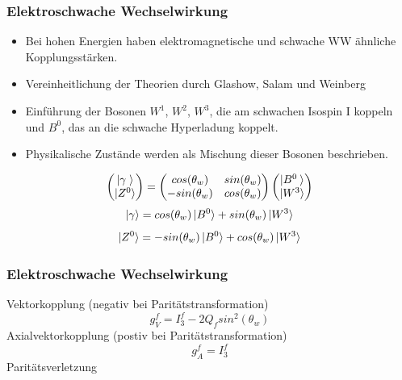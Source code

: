 \begin{frame}
	\frametitle{Elektroschwache Wechselwirkung}
	\begin{center}
		\begin{itemize}
			\item
			Bei hohen Energien haben elektromagnetische und schwache WW ähnliche Kopplungsstärken.
			\item
			Vereinheitlichung der Theorien durch Glashow, Salam und Weinberg
			\item
			Einführung der Bosonen $W^1$, $W^2$, $W^3$, die am schwachen Isospin I koppeln und $B^0$, das an die schwache Hyperladung koppelt.
			\item
			Physikalische Zustände werden als Mischung dieser Bosonen beschrieben.
		\end{itemize}
		\begin{equation*}
		\begin{pmatrix}
		\ket{\gamma\;}\\
		\ket{Z^0}
		\end{pmatrix} = 
		\begin{pmatrix}
		cos(\theta_w) & sin(\theta_w)\\
		-sin(\theta_w) & cos(\theta_w)\\
		\end{pmatrix}
		\begin{pmatrix}
		\ket{B^0\:}\\
		\ket{W^3}
		\end{pmatrix}
		\end{equation*}
		\begin{equation*}
			\ket{\gamma} =  cos(\theta_w)\ket{B^0} + sin(\theta_w) \ket{W^3}
		\end{equation*}
		\begin{equation*}
		\ket{Z^0} = -sin(\theta_w) \ket{B^0} + cos(\theta_w) \ket{W^3}
		\end{equation*}
	\end{center}
\end{frame}

\begin{frame}
	\begin{center}
	\frametitle{Elektroschwache Wechselwirkung}
	Vektorkopplung (negativ bei Paritätstransformation)
	\begin{equation*}
	g_V^f = I^f_3-2 Q_f sin^2(\theta_w)
	\end{equation*}
	Axialvektorkopplung (postiv bei Paritätstransformation)
	\begin{equation*}
	g_A^f = I^f_3
	\end{equation*}
	Paritätsverletzung
	\end{center}
\end{frame}
